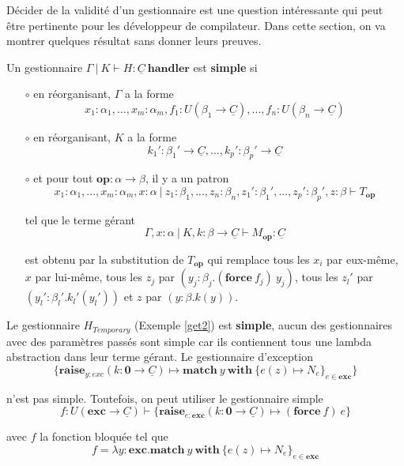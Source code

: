 Décider de la validité d'un gestionnaire est une question intéressante qui peut être pertinente pour les développeur de compilateur. Dans cette section, on va montrer quelques résultat sans donner leurs preuves.

\begin{definition}
	Un gestionnaire $\Gamma~|~K \vdash H:\underline{C}~\textbf{handler}$ est \textbf{simple} si
	
	\begin{enumerate}
		\item[$\circ$] en réorganisant, $\Gamma$ a la forme 
		\[x_1:\alpha_1,...,x_m:\alpha_m,f_1:U(\beta_1 \rightarrow \underline{C}),...,f_n:U(\beta_n \rightarrow \underline{C})\]
		
		\item[$\circ$] en réorganisant, $K$ a la forme
		\[k_1':\beta_1' \rightarrow \underline{C},...,k_p':\beta_p' \rightarrow \underline{C}\]
		
		\item[$\circ$] et pour tout $\textbf{op}: \alpha \rightarrow \beta$, il y a un patron
		\[x_1:\alpha_1,...,x_m:\alpha_m,x:\alpha~|~z_1:\beta_1,...,z_n:\beta_n,z_1':\beta_1',...,z_p':\beta_p',z:\beta \vdash T_\textbf{op}\]
		
		tel que le terme gérant 
		\[\Gamma,x:\alpha~|~K,k:\beta \rightarrow \underline{C} \vdash M_\textbf{op}:\underline{C}\]
		
		est obtenu par la substitution de $T_\textbf{op}$ qui remplace tous les $x_i$ par eux-même, $x$ par lui-même, tous les $z_j$ par $(y_j:\beta_j.(\textbf{force}~f_j)~y_j)$, tous les $z_l'$ par $(y_l':\beta_l'.k_l'(y_l'))$ et $z$ par $(y:\beta.k(y))$.
	\end{enumerate}
\end{definition}

Le gestionnaire $H_{Temporary}$ (Exemple \ref{get2}) est \textbf{simple}, aucun des gestionnaires avec des paramètres passés sont simple car ils contiennent tous une lambda abstraction dans leur terme gérant. Le gestionnaire d'exception 
\[\{\textbf{raise}_{y:exc}(k:\textbf{0} \rightarrow \underline{C}) \mapsto \textbf{match}~y~\textbf{with}~\{e(z) \mapsto N_e\}_{e \in \textbf{exc}}\}\] 

n'est pas simple. Toutefois, on peut utiliser le gestionnaire simple
\[f:U(\textbf{exc} \rightarrow \underline{C}) \vdash \{\textbf{raise}_{e : \textbf{exc}}(k:\textbf{0} \rightarrow \underline{C}) \mapsto (\textbf{force}~f)~e\}\]

avec  $f$ la fonction bloquée tel que 
	\[f = \lambda y:\textbf{exc}.\textbf{match}~y~\textbf{with}~\{e(z) \mapsto N_e\}_{e \in \textbf{exc}}\]
	
